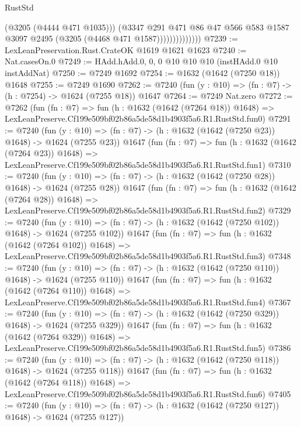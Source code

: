 \begin{lexlean}{RustStd}
\begin{coremodule}
                            (@3205 (@4444 @471 @1035)))
                          (@3347
                            @291
                            @471
                            @86
                            @47
                            @566
                            @583
                            @1587
                            @3097
                            @2495
                            (@3205 (@4468 @471 @1587))))))))))))))
@7239 := LexLeanPreservation.Rust.CrateOK @1619 @1621 @1623
@7240 := Nat.casesOn.{0}
@7249 := HAdd.hAdd.{0, 0, 0} @10 @10 @10 (instHAdd.{0} @10 instAddNat)
@7250 := @7249 @1692
@7254 := @1632 (@1642 (@7250 @18)) @1648
@7255 := @7249 @1690
@7262 := @7240 (fun (y : @10) => (fn : @7) -> (h : @7254) -> @1624 (@7255 @18)) @1647
@7264 := @7249 Nat.zero
@7272 := @7262
    (fun (fn : @7) =>
    fun (h : @1632 (@1642 (@7264 @18)) @1648) =>
    LexLeanPreserve.Cf199e509bf02b86a5de58d1b4903f5a6.R1.RustStd.fun0)
@7291 := @7240
    (fun (y : @10) => (fn : @7) -> (h : @1632 (@1642 (@7250 @23)) @1648) -> @1624 (@7255 @23))
    @1647
    (fun (fn : @7) =>
    fun (h : @1632 (@1642 (@7264 @23)) @1648) =>
    LexLeanPreserve.Cf199e509bf02b86a5de58d1b4903f5a6.R1.RustStd.fun1)
@7310 := @7240
    (fun (y : @10) => (fn : @7) -> (h : @1632 (@1642 (@7250 @28)) @1648) -> @1624 (@7255 @28))
    @1647
    (fun (fn : @7) =>
    fun (h : @1632 (@1642 (@7264 @28)) @1648) =>
    LexLeanPreserve.Cf199e509bf02b86a5de58d1b4903f5a6.R1.RustStd.fun2)
@7329 := @7240
    (fun (y : @10) => (fn : @7) -> (h : @1632 (@1642 (@7250 @102)) @1648) -> @1624 (@7255 @102))
    @1647
    (fun (fn : @7) =>
    fun (h : @1632 (@1642 (@7264 @102)) @1648) =>
    LexLeanPreserve.Cf199e509bf02b86a5de58d1b4903f5a6.R1.RustStd.fun3)
@7348 := @7240
    (fun (y : @10) => (fn : @7) -> (h : @1632 (@1642 (@7250 @110)) @1648) -> @1624 (@7255 @110))
    @1647
    (fun (fn : @7) =>
    fun (h : @1632 (@1642 (@7264 @110)) @1648) =>
    LexLeanPreserve.Cf199e509bf02b86a5de58d1b4903f5a6.R1.RustStd.fun4)
@7367 := @7240
    (fun (y : @10) => (fn : @7) -> (h : @1632 (@1642 (@7250 @329)) @1648) -> @1624 (@7255 @329))
    @1647
    (fun (fn : @7) =>
    fun (h : @1632 (@1642 (@7264 @329)) @1648) =>
    LexLeanPreserve.Cf199e509bf02b86a5de58d1b4903f5a6.R1.RustStd.fun5)
@7386 := @7240
    (fun (y : @10) => (fn : @7) -> (h : @1632 (@1642 (@7250 @118)) @1648) -> @1624 (@7255 @118))
    @1647
    (fun (fn : @7) =>
    fun (h : @1632 (@1642 (@7264 @118)) @1648) =>
    LexLeanPreserve.Cf199e509bf02b86a5de58d1b4903f5a6.R1.RustStd.fun6)
@7405 := @7240
    (fun (y : @10) => (fn : @7) -> (h : @1632 (@1642 (@7250 @127)) @1648) -> @1624 (@7255 @127))

\end{coremodule}
\end{lexlean}
